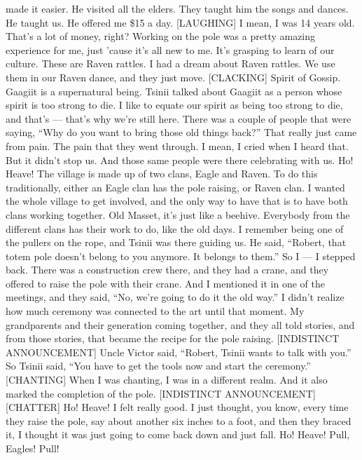 \begin{itemize}
  made it easier. He visited all the elders. They taught him the songs
  and dances. He taught us. He offered me \$15 a day. {[}LAUGHING{]} I
  mean, I was 14 years old. That's a lot of money, right? Working on the
  pole was a pretty amazing experience for me, just 'cause it's all new
  to me. It's grasping to learn of our culture. These are Raven rattles.
  I had a dream about Raven rattles. We use them in our Raven dance, and
  they just move. {[}CLACKING{]} Spirit of Gossip. Gaagiit is a
  supernatural being. Tsinii talked about Gaagiit as a person whose
  spirit is too strong to die. I like to equate our spirit as being too
  strong to die, and that's --- that's why we're still here. There was a
  couple of people that were saying, ``Why do you want to bring those
  old things back?'' That really just came from pain. The pain that they
  went through. I mean, I cried when I heard that. But it didn't stop
  us. And those same people were there celebrating with us. Ho! Heave!
  The village is made up of two clans, Eagle and Raven. To do this
  traditionally, either an Eagle clan has the pole raising, or Raven
  clan. I wanted the whole village to get involved, and the only way to
  have that is to have both clans working together. Old Masset, it's
  just like a beehive. Everybody from the different clans has their work
  to do, like the old days. I remember being one of the pullers on the
  rope, and Tsinii was there guiding us. He said, ``Robert, that totem
  pole doesn't belong to you anymore. It belongs to them.'' So I --- I
  stepped back. There was a construction crew there, and they had a
  crane, and they offered to raise the pole with their crane. And I
  mentioned it in one of the meetings, and they said, ``No, we're going
  to do it the old way.'' I didn't realize how much ceremony was
  connected to the art until that moment. My grandparents and their
  generation coming together, and they all told stories, and from those
  stories, that became the recipe for the pole raising. {[}INDISTINCT
  ANNOUNCEMENT{]} Uncle Victor said, ``Robert, Tsinii wants to talk with
  you.'' So Tsinii said, ``You have to get the tools now and start the
  ceremony.'' {[}CHANTING{]} When I was chanting, I was in a different
  realm. And it also marked the completion of the pole. {[}INDISTINCT
  ANNOUNCEMENT{]} {[}CHATTER{]} Ho! Heave! I felt really good. I just
  thought, you know, every time they raise the pole, say about another
  six inches to a foot, and then they braced it, I thought it was just
  going to come back down and just fall. Ho! Heave! Pull, Eagles! Pull!

\end{itemize}
